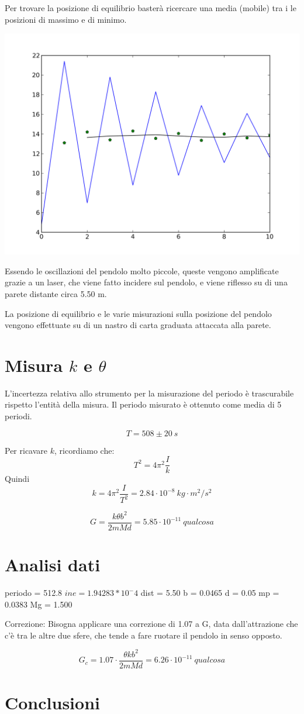 Per trovare la posizione di equilibrio basterà ricercare una media (mobile) tra i le posizioni di massimo e di minimo.

\begin{center}
 \includegraphics[scale=0.50]{../grafici/cavendish/oscillazioni.png}
\end{center}

Essendo le oscillazioni del pendolo molto piccole, queste vengono amplificate grazie a un laser, che viene fatto incidere sul pendolo, e viene riflesso su di una parete distante circa 5.50 m.

La posizione di equilibrio e le varie misurazioni sulla posizione del pendolo vengono effettuate su di un nastro di carta graduata attaccata alla parete.


\section[Misura di k e theta]{Misura $k$ e $\theta$}
L'incertezza relativa allo strumento per la misurazione del periodo è trascurabile rispetto l'entità della misura. 
Il periodo misurato è ottenuto come media di 5 periodi.

$$T = 508 \pm 20 \ s$$

Per ricavare $k$, ricordiamo che:
$$T^2 = 4 \pi^2 \frac{I}{k}$$
Quindi
$$k = 4 \pi^2 \frac{I}{T^2} = 2.84 \cdot 10^{-8}\ kg\cdot m^2/s^2$$


$$G = \frac{k \theta b^2}{2mMd} = 5.85 \cdot 10^{-11}\ qualcosa$$

\section{Analisi dati} 

periodo = 512.8
$ine = 1.94283*10^-4$
dist = 5.50
b = 0.0465
d = 0.05
mp = 0.0383
Mg = 1.500

Correzione:
Bisogna applicare una correzione di 1.07 a G, data dall'attrazione che c'è tra le altre due sfere, che tende a fare ruotare il pendolo in senso opposto.

$$ G_c = 1.07\cdot \frac{\theta k b^2}{2mMd} = 6.26\cdot 10^{-11}\ qualcosa$$

\section{Conclusioni}
